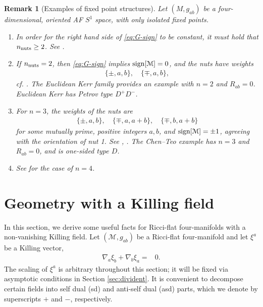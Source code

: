 \documentclass[a4paper,10pt,reqno]{amsart}
\newcommand{\sign}{\mathop{\rm sign}}
\newcommand{\cM}{\mathcal{M}}
\theoremstyle{plain}
\newtheorem{remark}[thm]{Remark}
\newcommand{\nnuts}{n_{\text{\rm nuts}}}
\numberwithin{equation}{section}
\begin{document}
\begin{remark}[Examples of fixed point structures]
\label{rem:nutfacts} 
Let $(M, g_{ab})$ be a four-dim\-en\-sional, oriented AF $S^1$ space, with only isolated fixed points. 
%
\begin{enumerate} 
\item In order for the right hand side of \eqref{eq:G-sign} to be constant, it must hold that $\nnuts \geq 2$. See \cite[Remark 3.2]{MR3343967}. 
\item \label{point:2nut} 
If $\nnuts=2$, then \eqref{eq:G-sign} implies $\sign[\cM]=0$, and the nuts have weights 
\begin{align}
\{\pm, a, b\}, \quad  \{\mp,a,b\},
\end{align} 
cf. \cite[Remark 3.4]{MR3343967}.
The Euclidean Kerr family provides an example with $n=2$ and $R_{ab} = 0$. Euclidean Kerr has Petrov type $D^+D^-$. 
\item \label{point:3nut} 
For $n=3$, the weights of the nuts are 
\begin{align} 
\{\pm, a,b\} , \quad \{\mp, a, a+b\}, \quad \{ \mp, b, a+b\}
\end{align} 
for some mutually prime, positive integers $a,b$, and $\sign[\cM] = \pm 1$, agreeing with the orientation of nut 1. See \cite[Theorem 1.8]{MR3343967}, \cite[Theorem 7.1]{2018JGP...133..181J}. The Chen--Teo example \cite{2011PhLB..703..359C} has $n=3$ and $R_{ab} = 0$, and is one-sided type $D$.
\item See \cite[Theorem 7.2]{2018JGP...133..181J} for the case of $n=4$.  
%
\end{enumerate} 
\end{remark}

\section{Geometry with a Killing field}\label{sec:S1inst} 

In this section, we derive some useful facts for Ricci-flat four-manifolds with a non-vanishing Killing field. 
Let $(\cM, g_{ab})$ be a Ricci-flat four-manifold and let 
$\xi^a$ be a Killing vector,
\begin{align}
\nabla_{a}\xi_{b} + \nabla_{b}\xi_{a}={}&0.
\end{align}
The scaling of $\xi^a$ is arbitrary throughout this section; it will be fixed via  asymptotic conditions in Section \ref{sec:divident}. 
It is convenient to decompose certain fields into self dual (sd) and anti-self dual (asd) parts, which we denote by superscripts $+$ and $-$, respectively.
\end{document}
